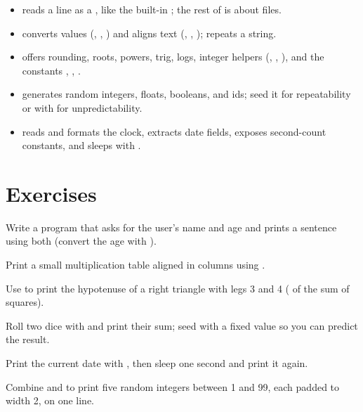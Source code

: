 \begin{itemize}[leftmargin=1.4em]
  \item {} reads a line as a , like the built-in
        ; the rest of  is about files.
  \item {} converts values (, , ) and
        aligns text (, , );
         repeats a string.
  \item {} offers rounding, roots, powers, trig, logs, integer helpers
        (, , ), and the constants ,
        , .
  \item {} generates random integers, floats, booleans, and ids; seed it
        for repeatability or with  for unpredictability.
  \item {} reads and formats the clock, extracts date fields, exposes
        second-count constants, and sleeps with .
\end{itemize}

\section{Exercises}

\exercise Write a program that asks for the user's name and age and prints a
sentence using both (convert the age with ).

\exercise Print a small multiplication table aligned in columns using
.

\exercise Use  to print the hypotenuse of a right triangle with legs 3
and 4 ( of the sum of squares).

\exercise Roll two dice with  and print their sum; seed with a
fixed value so you can predict the result.

\exercise Print the current date with , then sleep
one second and print it again.

\exercise Combine  and  to print five random integers between
1 and 99, each padded to width 2, on one line.
